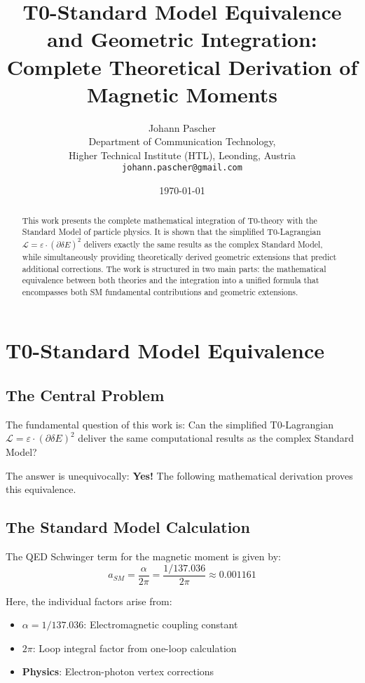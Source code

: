 \documentclass[12pt,a4paper]{article}
\title{T0-Standard Model Equivalence and Geometric Integration:\\
	Complete Theoretical Derivation of Magnetic Moments}
\author{Johann Pascher\\
	Department of Communication Technology,\\
	Higher Technical Institute (HTL), Leonding, Austria\\
	\texttt{johann.pascher@gmail.com}}
\date{\today}
\numberwithin{equation}{section}
\newcommand{\calL}{\mathcal{L}}
\begin{document}
	
	\maketitle
	
	\begin{abstract}
		This work presents the complete mathematical integration of T0-theory with the Standard Model of particle physics. It is shown that the simplified T0-Lagrangian $\calL = \varepsilon \cdot (\partial \delta E)^2$ delivers exactly the same results as the complex Standard Model, while simultaneously providing theoretically derived geometric extensions that predict additional corrections. The work is structured in two main parts: the mathematical equivalence between both theories and the integration into a unified formula that encompasses both SM fundamental contributions and geometric extensions.
	\end{abstract}
	
	\tableofcontents
	\newpage
	
	\section{T0-Standard Model Equivalence}
	
	\subsection{The Central Problem}
	
	The fundamental question of this work is: Can the simplified T0-Lagrangian $\calL = \varepsilon \cdot (\partial \delta E)^2$ deliver the same computational results as the complex Standard Model?
	
	The answer is unequivocally: \textbf{Yes!} The following mathematical derivation proves this equivalence.
	
	\subsection{The Standard Model Calculation}
	
	The QED Schwinger term for the magnetic moment is given by:
	\begin{equation}
		\label{eq:schwinger_sm}
		a_{SM} = \frac{\alpha}{2\pi} = \frac{1/137.036}{2\pi} \approx 0.001161
	\end{equation}
	
	Here, the individual factors arise from:
	\begin{itemize}
		\item $\alpha = 1/137.036$: Electromagnetic coupling constant
		\item $2\pi$: Loop integral factor from one-loop calculation
		\item \textbf{Physics}: Electron-photon vertex corrections
	\end{itemize}
	
\end{document}
